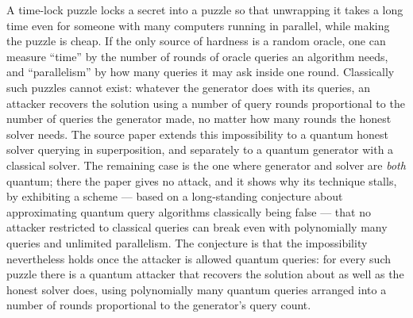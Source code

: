\documentclass{conjura-conjecture}
\begin{document}

\vspace{0.4em}

\begin{informalconjecture}
A time-lock puzzle locks a secret into a puzzle so that unwrapping it takes
a long time even for someone with many computers running in parallel, while
making the puzzle is cheap. If the only source of hardness is a random
oracle, one can measure ``time'' by the number of rounds of oracle queries
an algorithm needs, and ``parallelism'' by how many queries it may ask
inside one round. Classically such puzzles cannot exist: whatever the
generator does with its queries, an attacker recovers the solution using a
number of query rounds proportional to the number of queries the generator
made, no matter how many rounds the honest solver needs. The source paper
extends this impossibility to a quantum honest solver querying in
superposition, and separately to a quantum generator with a classical
solver. The remaining case is the one where generator and solver are
\emph{both} quantum; there the paper gives no attack, and it shows why its
technique stalls, by exhibiting a scheme --- based on a long-standing
conjecture about approximating quantum query algorithms classically being
false --- that no attacker restricted to classical queries can break even
with polynomially many queries and unlimited parallelism. The conjecture is
that the impossibility nevertheless holds once the attacker is allowed
quantum queries: for every such puzzle there is a quantum attacker that
recovers the solution about as well as the honest solver does, using
polynomially many quantum queries arranged into a number of rounds
proportional to the generator's query count.
\end{informalconjecture}
\end{document}
